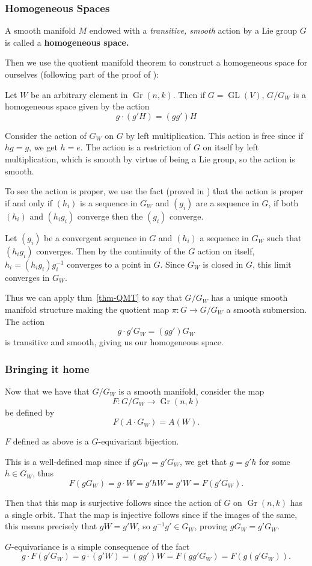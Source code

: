 \documentclass[12pt]{article}
\DeclareMathOperator{\Gr}{Gr}
\DeclareMathOperator{\GL}{GL}
\begin{document}
\subsubsection{Homogeneous Spaces}
\begin{defn}
	A smooth manifold $M$ endowed with a \textit{transitive, smooth} action by a Lie group $G$ is called
	a \textbf{homogeneous space.}
\end{defn}
Then we use the quotient manifold theorem to construct a homogeneous space for ourselves (following part of the proof of \cite[thm. 21.17]{LeeISM}):
\begin{prop}
	Let $W$ be an arbitrary element in $\Gr(n,k)$. Then if $G=\GL(V)$, $G/G_W$ is a homogeneous space given by the action
	\[g\cdot (g'H)=(gg')H\]
\end{prop}
\begin{prf}
	Consider the action of $G_W$ on $G$ by left multiplication. This action is free since if $hg=g$, we get $h=e$. The action is a restriction of 
	$G$ on itself by left multiplication, which is smooth by virtue of being a Lie group, so the action is smooth.

	To see the action is proper, we use the fact (proved in \cite[prop. 21.5(a,b)]{LeeISM}) that the action is proper if and only if $(h_i)$ is a sequence in $G_W$ and 
	$(g_i)$ are a sequence in $G$, if both $(h_i)$ and $(h_ig_i)$ converge then the $(g_i)$ converge.

	Let $(g_i)$ be a convergent sequence in $G$ and $(h_i)$ a sequence in $G_W$ such that $(h_ig_i)$ converges. Then by the continuity of 
	the $G$ action on itself, $h_i=(h_ig_i)g_i^{-1}$ converges to a point in $G$. Since $G_W$ is closed in $G$, this limit converges in $G_W$.

	Thus we can apply thm~\ref{thm-QMT} to say that $G/G_W$ has a unique smooth manifold structure making the quotient map $\pi:G\to G/G_W$ a smooth submersion. The action 
	\[g\cdot g'G_W=(gg')G_W\]
	is transitive and smooth, giving us our homogeneous space.
\end{prf}
\subsubsection{Bringing it home}
Now that we have that $G/G_W$ is a smooth manifold, consider the map
\[F:G/G_W\to \Gr(n,k)\]
be defined by 
\[F(A\cdot G_W)=A(W).\]

\begin{lem}
	$F$ defined as above is a $G$-equivariant bijection.
\end{lem}
\begin{prf}
	This is a well-defined map since if $gG_W=g'G_W$, we get that $g=g'h$ for some $h\in G_W$, thus
	\[F(gG_W)=g\cdot W=g'hW=g'W=F(g'G_W).\]

	Then that this map is surjective follows since the action of $G$ on $\Gr(n,k)$ has a single orbit. That 
	the map is injective follows since if the images of the same, this means precisely that $gW=g'W$, so $g^{-1}g'\in G_W$,
	proving $gG_W=g'G_W$.

	$G$-equivariance is a simple consequence of the fact 
	\[g\cdot F(g'G_W)=g\cdot (g'W)=(gg')W=F(gg'G_W)=F(g(g'G_W)).\]
\end{prf}
\end{document}
